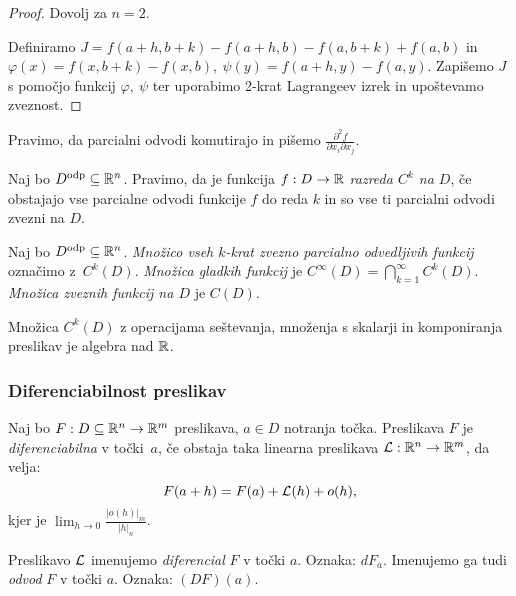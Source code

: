 \begin{proof}
    Dovolj za $n=2$. 
    
    Definiramo $J = f(a+h, b+k) - f(a+h, b) - f(a, b+k) + f(a,b)$ in $\varphi(x) = f(x, b+k) - f(x, b), \ \psi(y) = f(a+h, y) - f(a, y)$. Zapišemo $J$ s pomočjo funkcij $\varphi, \ \psi$ ter uporabimo 2-krat Lagrangeev izrek in upoštevamo zveznost.
\end{proof}

\begin{opomba}
     Pravimo, da parcialni odvodi komutirajo in pišemo $\frac{\partial^2 f}{\partial x_i \partial x_j}$.
\end{opomba}

\begin{definicija}
    Naj bo $D^\text{odp} \subseteq \mathbb{R}^n$. Pravimo, da je funkcija $f: D \to \mathbb{R}$ \emph{razreda $C^k$ na $D$}, če obstajajo vse parcialne odvodi funkcije $f$ do reda $k$ in so vse ti parcialni odvodi zvezni na $D$.
\end{definicija}

\begin{definicija}
    Naj bo $D^\text{odp} \subseteq \mathbb{R}^n$. \emph{Množico vseh $k$-krat zvezno parcialno odvedljivih funkcij} označimo z~$C^k(D)$. \emph{Množica gladkih funkcij} je $C^\infty(D) = \bigcap_{k=1}^\infty C^k(D)$. \emph{Množica zveznih funkcij na $D$} je $C(D)$.
\end{definicija}

\begin{opomba}
    Množica $C^k(D)$ z operacijama seštevanja, množenja s skalarji in komponiranja preslikav je algebra nad $\mathbb{R}$.
\end{opomba}

\subsubsection{Diferenciabilnost preslikav}

\begin{definicija}
    Naj bo $F: D \subseteq \mathbb{R}^n \to \mathbb{R}^m$ preslikava, $a \in D$ notranja točka. Preslikava $F$ je \emph{diferenciabilna} v točki~$a$, če obstaja taka linearna preslikava $\mathcal{L}: \mathbb{R}^n \to \mathbb{R}^m$, da velja:
    $$F(a+h) = F(a) + \mathcal{L}(h) + o(h),$$
    kjer je $\lim_{h \to 0} \frac{|o(h)|_m}{|h|_n}$. 

    Preslikavo $\mathcal{L}$ imenujemo \emph{diferencial} $F$ v točki $a$. Oznaka: $dF_a$. Imenujemo ga tudi \emph{odvod} $F$ v točki $a$. Oznaka: $(DF)(a)$.
\end{definicija}

